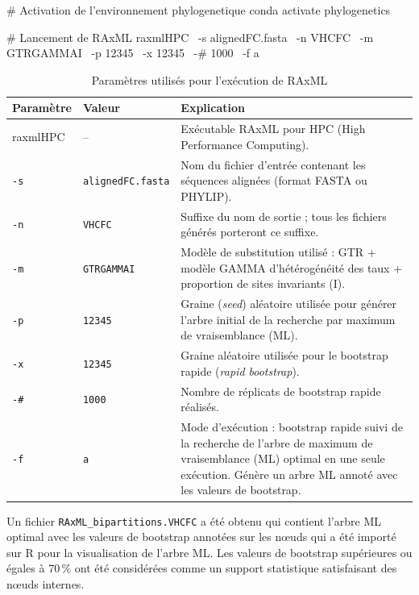 \documentclass[a4paper,12pt]{article}
\begin{document}
\begin{terminal}
# Activation de l'environnement phylogenetique
conda activate phylogenetics

# Lancement de RAxML
raxmlHPC \
-s alignedFC.fasta \
-n VHCFC \
-m GTRGAMMAI \
-p 12345 \
-x 12345 \
-# 1000 \
-f a
\end{terminal}


\begin{table}[!htbp]
\centering
\caption{Paramètres utilisés pour l'exécution de RAxML}
\label{tab:raxml_parametres}
\begin{tabular}{p{3cm} p{3cm} p{8cm}}
\toprule
\textbf{Paramètre} & \textbf{Valeur} & \textbf{Explication} \\
\midrule
raxmlHPC & -- & Exécutable RAxML pour HPC (High Performance Computing). \\

\texttt{-s} & \texttt{alignedFC.fasta} &
Nom du fichier d'entrée contenant les séquences alignées (format FASTA ou PHYLIP). \\

\texttt{-n} & \texttt{VHCFC} &
Suffixe du nom de sortie ; tous les fichiers générés porteront ce suffixe. \\

\texttt{-m} & \texttt{GTRGAMMAI} &
Modèle de substitution utilisé : GTR + modèle GAMMA d'hétérogénéité des taux + proportion de sites invariants (I). \\

\texttt{-p} & \texttt{12345} &
Graine (\textit{seed}) aléatoire utilisée pour générer l'arbre initial de la recherche par maximum de vraisemblance (ML). \\

\texttt{-x} & \texttt{12345} &
Graine aléatoire utilisée pour le bootstrap rapide (\textit{rapid bootstrap}). \\

\texttt{-\#} & \texttt{1000} &
Nombre de réplicats de bootstrap rapide réalisés. \\

\texttt{-f} & \texttt{a} &
Mode d'exécution : bootstrap rapide suivi de la recherche de l'arbre de maximum de vraisemblance (ML) optimal en une seule exécution. Génère un arbre ML annoté avec les valeurs de bootstrap. \\
\bottomrule
\end{tabular}
\end{table}
\newpage
Un fichier \texttt{RAxML\_bipartitions.VHCFC} a été obtenu qui contient l’arbre ML optimal avec les valeurs de bootstrap annotées sur les nœuds qui a été importé sur R pour la visualisation de l’arbre ML.
Les valeurs de bootstrap supérieures ou égales à 70\,\% ont été considérées comme un support statistique satisfaisant des nœuds internes.
\end{document}
